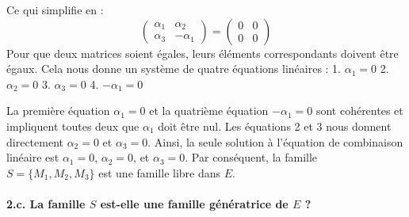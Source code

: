 \documentclass{report}
\begin{document}
Ce qui simplifie en :
$$ \begin{pmatrix} \alpha_1 & \alpha_2 \\ \alpha_3 & -\alpha_1 \end{pmatrix} = \begin{pmatrix} 0 & 0 \\ 0 & 0 \end{pmatrix} $$
Pour que deux matrices soient égales, leurs éléments correspondants doivent être égaux. Cela nous donne un système de quatre équations linéaires :
1.  $\alpha_1 = 0$
2.  $\alpha_2 = 0$
3.  $\alpha_3 = 0$
4.  $-\alpha_1 = 0$

La première équation $\alpha_1 = 0$ et la quatrième équation $-\alpha_1 = 0$ sont cohérentes et impliquent toutes deux que $\alpha_1$ doit être nul.
Les équations 2 et 3 nous donnent directement $\alpha_2 = 0$ et $\alpha_3 = 0$.
Ainsi, la seule solution à l'équation de combinaison linéaire est $\alpha_1 = 0$, $\alpha_2 = 0$, et $\alpha_3 = 0$.
Par conséquent, la famille $S = \{M_1, M_2, M_3\}$ est une famille libre dans $E$.

\paragraph*{2.c. La famille $S$ est-elle une famille génératrice de $E$ ?}
\end{document}
